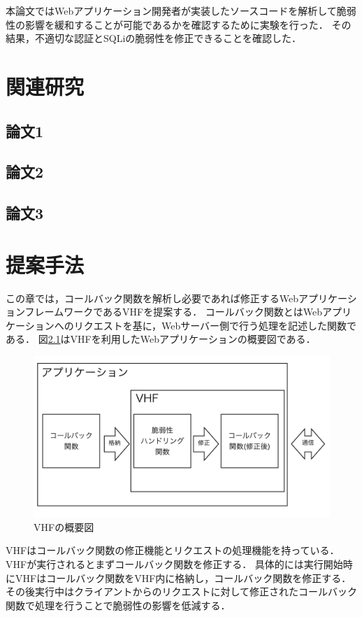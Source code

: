 \documentclass[a4paper,12pt]{jreport}
\begin{document}
本論文ではWebアプリケーション開発者が実装したソースコードを解析して脆弱性の影響を緩和することが可能であるかを確認するために実験を行った．
その結果，不適切な認証とSQLiの脆弱性を修正できることを確認した．

\chapter{関連研究}
\section{論文1}
\section{論文2}
\section{論文3}

\chapter{提案手法}
この章では，コールバック関数を解析し必要であれば修正するWebアプリケーションフレームワークであるVHFを提案する．
コールバック関数とはWebアプリケーションへのリクエストを基に，Webサーバー側で行う処理を記述した関数である．
図\ref{fig:vhf}はVHFを利用したWebアプリケーションの概要図である．
\begin{figure}[ht]
  \begin{center}
    \includegraphics[clip, width=130mm]{./figures/vhf.png}
    \caption{VHFの概要図}
    \label{fig:vhf}
  \end{center}
\end{figure}
VHFはコールバック関数の修正機能とリクエストの処理機能を持っている．
VHFが実行されるとまずコールバック関数を修正する．
具体的には実行開始時にVHFはコールバック関数をVHF内に格納し，コールバック関数を修正する．
その後実行中はクライアントからのリクエストに対して修正されたコールバック関数で処理を行うことで脆弱性の影響を低減する．
\end{document}
